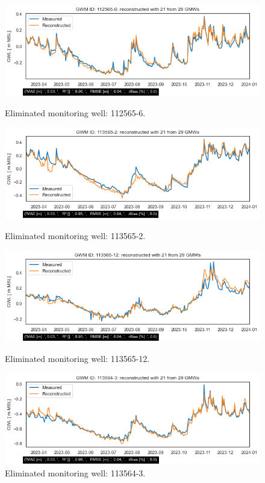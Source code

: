 \begin{figure}[h]
    \begin{minipage}{0.48\textwidth}
        \centering
        \includegraphics[width=\linewidth]{frontmatter/Rozenburg-fig/1125656.png}
        \caption{Eliminated monitoring well: 112565-6.}
        \label{112565-6}
    \end{minipage}\hfill
    \begin{minipage}{0.48\textwidth}
        \centering
        \includegraphics[width=\linewidth]{frontmatter/Rozenburg-fig/1135652.png}
        \caption{Eliminated monitoring well: 113565-2.}
        \label{113565-2}
    \end{minipage}
    \begin{minipage}{0.48\textwidth}
        \centering
        \includegraphics[width=\linewidth]{frontmatter/Rozenburg-fig/11356512.png}
        \caption{Eliminated monitoring well: 113565-12.}
        \label{113565-12}
    \end{minipage}\hfill
    \begin{minipage}{0.48\textwidth}
        \centering
        \includegraphics[width=\linewidth]{frontmatter/Rozenburg-fig/1135643.png}
        \caption{Eliminated monitoring well: 113564-3.}
        \label{113564-3}
    \end{minipage}


\end{figure}
